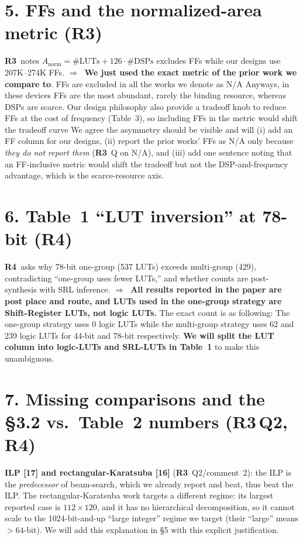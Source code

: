 \documentclass[10pt]{article}
\newcommand{\Rc}{\textbf{\textcolor{c3}{R3}}}
\newcommand{\Rd}{\textbf{\textcolor{c4}{R4}}}
\newcommand{\ans}{\textbf{$\Rightarrow$~}}
\begin{document}
\section*{5. FFs and the normalized-area metric \hfill {\normalsize(\Rc)}}

\Rc\ notes $A_{\text{norm}}=\#\text{LUTs}+126\cdot\#\text{DSPs}$ excludes FFs while our designs use 207K--274K FFs.
\ans \textbf{We just used the exact metric of the prior work we compare to}.
FFs are excluded in all the works we denote as N/A 
Anyways, in these devices FFs are the most abundant, rarely the binding resource, whereas DSPs are scarce.
Our design philosophy also provide a tradeoff knob to reduce FFs at the cost of frequency (Table~3), so including FFs in the metric would shift the tradeoff curve
We agree the asymmetry should be visible and will (i) add an FF column for our designs, (ii) report the prior works' FFs as N/A only because \emph{they do not report them} (\Rc\ Q on N/A), and (iii) add one sentence noting that an FF-inclusive metric would shift the tradeoff but not the DSP-and-frequency advantage, which is the scarce-resource axis.

\section*{6. Table~1 ``LUT inversion'' at 78-bit \hfill {\normalsize(\Rd)}}

\Rd\ asks why 78-bit one-group (537 LUTs) exceeds multi-group (429), contradicting ``one-group uses fewer LUTs,'' and whether counts are post-synthesis with SRL inference.
\ans \textbf{All results reported in the paper are post place and route, and LUTs used in the one-group strategy are Shift-Register LUTs, not logic LUTs.}
The exact count is as following:
The one-group strategy uses 0 logic LUTs while the multi-group strategy uses 62 and 239 logic LUTs for 44-bit and 78-bit respectively.
\textbf{We will split the LUT column into logic-LUTs and SRL-LUTs in Table~1} to make this unambiguous.


\section*{7. Missing comparisons and the \S3.2 vs.\ Table~2 numbers \hfill {\normalsize(\Rc\,Q2,\,\Rd)}}

\textbf{ILP [17] and rectangular-Karatsuba [16]} (\Rc\ Q2/comment~2): the ILP is the \emph{predecessor} of beam-search, which we already report and beat, thus beat the ILP.
The rectangular-Karatsuba work targets a different regime: its largest reported case is $112{\times}120$, and it has no hierarchical decomposition, so it cannot scale to the 1024-bit-and-up ``large integer'' regime we target (their ``large'' means $>64$-bit).
We will add this explanation in \S5 with this explicit justification.
\end{document}
